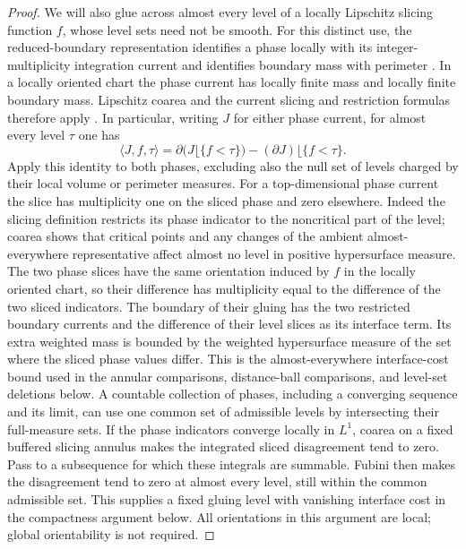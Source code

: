 \documentclass[11pt]{article}
\numberwithin{equation}{section}
\theoremstyle{definition}
\theoremstyle{remark}
\begin{document}
\begin{proof}
We will also glue across almost every level of a locally Lipschitz
slicing function $f$, whose level sets need not be smooth.
For this distinct use, the reduced-boundary representation identifies
a phase locally with its integer-multiplicity integration current and
identifies boundary mass with perimeter
\citep[Chapter~3, Section~4, Equation~(4.1) and Theorem~4.3]{simonGMT}.
In a locally oriented chart the phase current has locally finite mass
and locally finite boundary mass.  Lipschitz coarea and the current
slicing and restriction formulas therefore apply
\citep[Chapter~3, Section~2, Equations~(2.8)--(2.9);
Chapter~6, Section~4, Lemmas~4.1 and~4.5 and
Definition~4.4]{simonGMT}.
In particular, writing $J$ for either phase current, for almost every
level $\tau$ one has
\[
 \langle J,f,\tau\rangle
   =\partial\bigl(J\lfloor\{f<\tau\}\bigr)
             -(\partial J)\lfloor\{f<\tau\}.
\]
Apply this identity to both phases, excluding also the null set of
levels charged by their local volume or perimeter measures.
For a top-dimensional phase current the slice has multiplicity one
on the sliced phase and zero elsewhere.  Indeed the slicing
definition restricts its phase indicator to the noncritical part of
the level; coarea shows that critical points and any changes of the
ambient almost-everywhere representative affect almost no level in
positive hypersurface measure.  The two phase slices have the same
orientation induced by $f$ in the locally oriented chart, so their
difference has multiplicity equal to the difference of the two sliced
indicators.
The boundary of their gluing has the two restricted boundary currents
and the difference of their level slices as its interface term.
Its extra weighted mass is bounded by the weighted hypersurface
measure of the set where the sliced phase values differ.
This is the almost-everywhere interface-cost bound used in the
annular comparisons, distance-ball comparisons, and level-set
deletions below.  A countable collection of phases, including a
converging sequence and its limit, can use one common set of
admissible levels by intersecting their full-measure sets.
If the phase indicators converge locally in $L^1$, coarea on a fixed
buffered slicing annulus makes the integrated sliced disagreement
tend to zero.  Pass to a subsequence for which these integrals are
summable.  Fubini then makes the disagreement tend to zero at almost
every level, still within the common admissible set.
This supplies a fixed gluing level with vanishing interface cost in
the compactness argument below.  All orientations in this argument
are local; global orientability is not required.


\end{proof}
\end{document}
